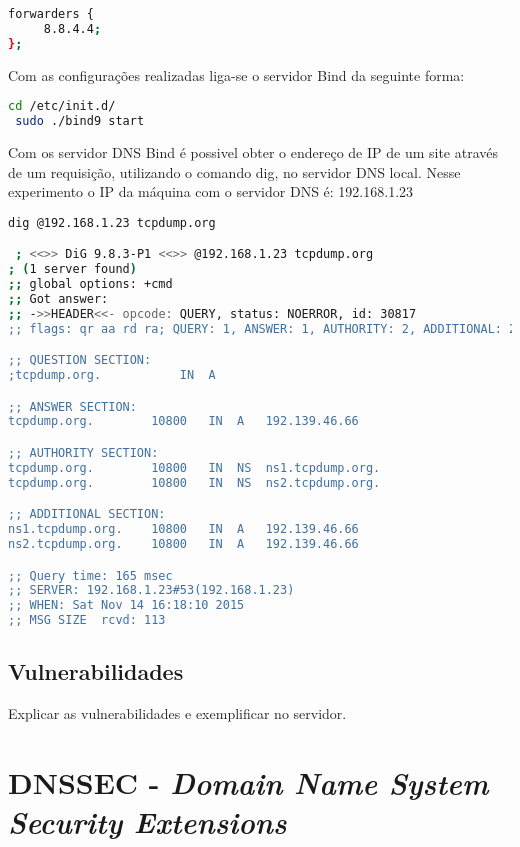 \documentclass[a4paper]{report} %
\begin{document}
\begin{lstlisting}[language=bash]
 forwarders {
     8.8.4.4;
};
\end{lstlisting}

Com as configurações realizadas liga-se o servidor Bind da seguinte forma:

\begin{lstlisting}[language=bash]
 cd /etc/init.d/
 sudo ./bind9 start
\end{lstlisting}

Com os servidor DNS Bind é possivel obter o endereço de IP de um site através de um requisição, utilizando o comando dig, no servidor DNS local. Nesse experimento o IP da máquina com o servidor DNS é: 192.168.1.23

\begin{lstlisting}[language=bash]
 dig @192.168.1.23 tcpdump.org

 ; <<>> DiG 9.8.3-P1 <<>> @192.168.1.23 tcpdump.org
; (1 server found)
;; global options: +cmd
;; Got answer:
;; ->>HEADER<<- opcode: QUERY, status: NOERROR, id: 30817
;; flags: qr aa rd ra; QUERY: 1, ANSWER: 1, AUTHORITY: 2, ADDITIONAL: 2

;; QUESTION SECTION:
;tcpdump.org.			IN	A

;; ANSWER SECTION:
tcpdump.org.		10800	IN	A	192.139.46.66

;; AUTHORITY SECTION:
tcpdump.org.		10800	IN	NS	ns1.tcpdump.org.
tcpdump.org.		10800	IN	NS	ns2.tcpdump.org.

;; ADDITIONAL SECTION:
ns1.tcpdump.org.	10800	IN	A	192.139.46.66
ns2.tcpdump.org.	10800	IN	A	192.139.46.66

;; Query time: 165 msec
;; SERVER: 192.168.1.23#53(192.168.1.23)
;; WHEN: Sat Nov 14 16:18:10 2015
;; MSG SIZE  rcvd: 113
\end{lstlisting}





\section{Vulnerabilidades }
\label{sec_vulnerabilidades}

Explicar as vulnerabilidades e exemplificar no servidor.

\chapter{ DNSSEC  - \textit{Domain Name System Security Extensions}}
\label{chap_dnssec}
\end{document}
